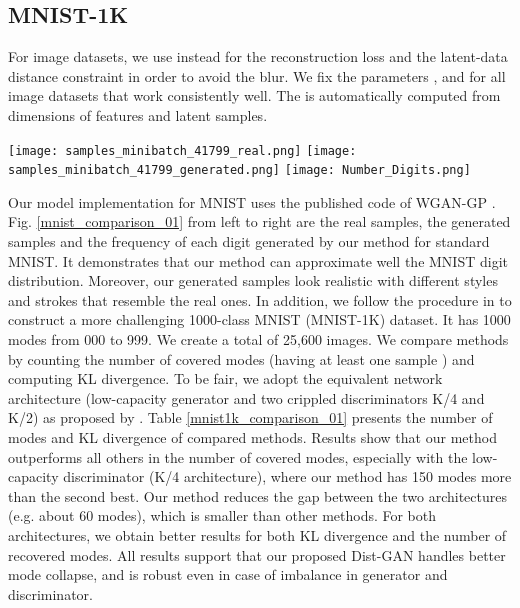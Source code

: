 \documentclass[runningheads]{llncs}
\newcommand*{\eg}{e.g. }
\begin{document}
\subsection{MNIST-1K}
For image datasets, we use  instead  for the reconstruction loss and the latent-data distance constraint in order to avoid the blur. We fix the parameters , and  for all image datasets that work consistently well. The  is automatically computed from dimensions of features  and latent samples.
\begin{figure*}[t]
\centering
\texttt{[image: samples\_minibatch\_41799\_real.png]}
\texttt{[image: samples\_minibatch\_41799\_generated.png]}
\texttt{[image: Number\_Digits.png]}
\caption{The real and our generated samples in one mini-batch. And the number of generated samples per class obtained by our method on the MNIST dataset. We compare our frequency of generated samples to the ground-truth via KL divergence: KL = 0.01.}
\label{mnist_comparison_01}
\end{figure*}
Our model implementation for MNIST uses the published code of WGAN-GP \cite{gulrajani-arxiv-2017}. Fig. \ref{mnist_comparison_01} from left to right are the real samples, the generated samples and the  frequency of each digit generated by our method for standard MNIST. It demonstrates that our method can approximate well the MNIST digit distribution. Moreover, our generated samples look realistic with different styles and strokes that resemble the real ones. In addition, we follow the procedure in  \cite{metz-arxiv-2016} to construct a more challenging 1000-class MNIST (MNIST-1K) dataset. 
It has 1000 modes from 000 to 999. 
We create a total of 25,600 images. We compare methods by counting the number of covered modes (having at least one sample \cite{metz-arxiv-2016}) and computing KL divergence. To be fair, we adopt the equivalent network architecture (low-capacity generator and two crippled discriminators K/4 and K/2) as proposed by \cite{metz-arxiv-2016}. Table \ref{mnist1k_comparison_01} presents the number of modes and KL divergence of compared methods. Results show that our method outperforms all others in the number of covered modes, especially with the low-capacity discriminator (K/4 architecture), where our method has  150 modes more than the second best. Our method reduces the gap between the two architectures (\eg about 60 modes), which is smaller than other methods. For both architectures, we obtain better results for both KL divergence and the number of recovered modes. All results support that our proposed Dist-GAN handles better mode collapse, and is robust even in case of imbalance in generator and discriminator.
\end{document}
